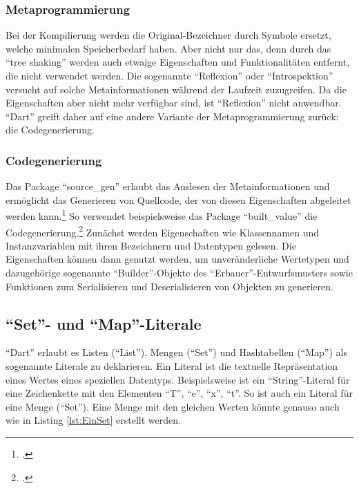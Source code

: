 \subsubsection{Metaprogrammierung}
Bei der Kompilierung werden die Original-Bezeichner durch Symbole ersetzt, welche minimalen Speicherbedarf haben.
Aber nicht nur das, denn durch das \enquote{tree shaking} werden auch etwaige Eigenschaften und Funktionalitäten entfernt, die nicht verwendet werden.
Die sogenannte \enquote{Reflexion} oder \enquote{Introspektion} versucht auf solche Metainformationen während der Laufzeit zuzugreifen.
Da die Eigenschaften aber nicht mehr verfügbar sind, ist \enquote{Reflexion} nicht anwendbar.
\enquote{Dart} greift daher auf eine andere Variante der Metaprogrammierung zurück: die Codegenerierung.

\subsubsection{Codegenerierung}
Das Package \enquote{source_gen} erlaubt das Auslesen der Metainformationen und ermöglicht das Generieren von Quellcode, der von diesen Eigenschaften abgeleitet werden kann.\footcite[Vgl.][]{SourceGen}
So verwendet beispielsweise das Package \enquote{built_value} die Codegenerierung.\footcite[Vgl.][]{BuiltValueGenerator}
Zunächst werden Eigenschaften wie Klassennamen und Instanzvariablen mit ihren Bezeichnern und Datentypen gelesen.
Die Eigenschaften können dann genutzt werden, um unveränderliche Wertetypen und dazugehörige sogenannte \enquote{Builder}-Objekte des \enquote{Erbauer}-Entwurfsmusters sowie Funktionen zum Serialisieren und Deserialisieren von Objekten zu generieren.

\subsection{\enquote{Set}- und \enquote{Map}-Literale}
\label{sec:SetUndMapLiterale}

\enquote{Dart} erlaubt es Listen (\enquote{List}), Mengen (\enquote{Set}) und Hashtabellen (\enquote{Map}) als sogenannte Literale zu deklarieren.
Ein Literal ist die textuelle Repräsentation eines Wertes eines speziellen Datentyps.
Beispielsweise ist   ein \enquote{String}-Literal für eine Zeichenkette mit den Elementen \enquote{T}, \enquote{e}, \enquote{x}, \enquote{t}.
So ist auch   ein Literal für eine Menge (\enquote{Set}).
Eine Menge mit den gleichen Werten könnte genauso auch wie in Listing \ref{lst:EinSet} erstellt werden.


